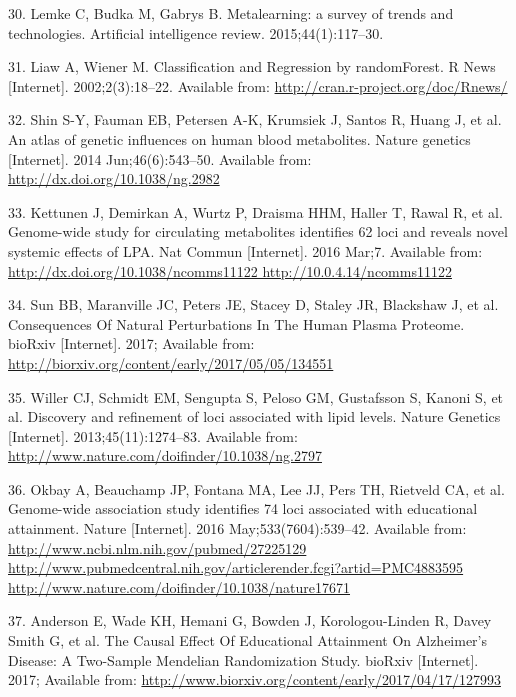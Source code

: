 \documentclass[]{article}
\begin{document}
\hypertarget{ref-lemke2015metalearning}{}
30. Lemke C, Budka M, Gabrys B. Metalearning: a survey of trends and
technologies. Artificial intelligence review. 2015;44(1):117--30.

\hypertarget{ref-Liaw2002}{}
31. Liaw A, Wiener M. Classification and Regression by randomForest. R
News {[}Internet{]}. 2002;2(3):18--22. Available from:
\url{http://cran.r-project.org/doc/Rnews/}

\hypertarget{ref-Shin2014}{}
32. Shin S-Y, Fauman EB, Petersen A-K, Krumsiek J, Santos R, Huang J, et
al. An atlas of genetic influences on human blood metabolites. Nature
genetics {[}Internet{]}. 2014 Jun;46(6):543--50. Available from:
\url{http://dx.doi.org/10.1038/ng.2982}

\hypertarget{ref-Kettunen2016}{}
33. Kettunen J, Demirkan A, Wurtz P, Draisma HHM, Haller T, Rawal R, et
al. Genome-wide study for circulating metabolites identifies 62 loci and
reveals novel systemic effects of LPA. Nat Commun {[}Internet{]}. 2016
Mar;7. Available from:
\href{http://dx.doi.org/10.1038/ncomms11122\%20http://10.0.4.14/ncomms11122}{http://dx.doi.org/10.1038/ncomms11122 http://10.0.4.14/ncomms11122}

\hypertarget{ref-Sun2017}{}
34. Sun BB, Maranville JC, Peters JE, Stacey D, Staley JR, Blackshaw J,
et al. Consequences Of Natural Perturbations In The Human Plasma
Proteome. bioRxiv {[}Internet{]}. 2017; Available from:
\url{http://biorxiv.org/content/early/2017/05/05/134551}

\hypertarget{ref-Willer2013}{}
35. Willer CJ, Schmidt EM, Sengupta S, Peloso GM, Gustafsson S, Kanoni
S, et al. Discovery and refinement of loci associated with lipid levels.
Nature Genetics {[}Internet{]}. 2013;45(11):1274--83. Available from:
\url{http://www.nature.com/doifinder/10.1038/ng.2797}

\hypertarget{ref-Okbay2016}{}
36. Okbay A, Beauchamp JP, Fontana MA, Lee JJ, Pers TH, Rietveld CA, et
al. Genome-wide association study identifies 74 loci associated with
educational attainment. Nature {[}Internet{]}. 2016
May;533(7604):539--42. Available from:
\href{http://www.ncbi.nlm.nih.gov/pubmed/27225129\%20http://www.pubmedcentral.nih.gov/articlerender.fcgi?artid=PMC4883595\%20http://www.nature.com/doifinder/10.1038/nature17671}{http://www.ncbi.nlm.nih.gov/pubmed/27225129 http://www.pubmedcentral.nih.gov/articlerender.fcgi?artid=PMC4883595 http://www.nature.com/doifinder/10.1038/nature17671}

\hypertarget{ref-Anderson2017}{}
37. Anderson E, Wade KH, Hemani G, Bowden J, Korologou-Linden R, Davey
Smith G, et al. The Causal Effect Of Educational Attainment On
Alzheimer's Disease: A Two-Sample Mendelian Randomization Study. bioRxiv
{[}Internet{]}. 2017; Available from:
\url{http://www.biorxiv.org/content/early/2017/04/17/127993}
\end{document}
